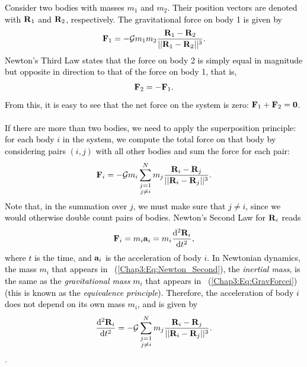 \documentclass[main.tex]{subfiles}
\begin{document}
\begin{tcolorbox}[sharp corners, colback=blue!30, colframe=blue!80!blue, title=Box \refstepcounter{educhap3}\label{boxchap3:dynII}\ref{boxchap3:dynII} -- Orbital Dynamics II]
\par \textcolor{black}{Consider two bodies with masses $m_1$ and $m_2$. Their position vectors are denoted with ${\mathbf{R}}_1$ and ${\mathbf{R}}_2$, respectively. The gravitational force on body 1 is given by
\begin{align}
\label{Chap3:Eq:F_1_vec}
{\mathbf{F}}_{1} = - \mathcal{G} m_1m_2 \frac{{\mathbf{R}}_1 - {\mathbf{R}}_2}{|| {\mathbf{R}}_1 - {\mathbf{R}}_2||^3}.
\end{align}
Newton's Third Law states that the force on body 2 is simply equal in magnitude but opposite in direction to that of the force on body 1, that is,
\begin{align}
{\mathbf{F}}_{2} = - {\mathbf{F}}_{1}.
\end{align}
From this, it is easy to see that the net force on the system is zero: ${\mathbf{F}}_1 + {\mathbf{F}}_2 = {\mathbf{0}}$. \\ \\
If there are more than two bodies, we need to apply the superposition principle: for each body $i$ in the system, we compute the total force on that body by considering pairs $(i,j)$ with all other bodies and sum the force for each pair:
\begin{align}
\label{Chap3:Eq:GravForcei}
{\mathbf{F}}_i = -\mathcal{G} m_i \sum_{\substack{j=1 \\ j\neq i}}^{N} m_j \frac{ {\mathbf{R}}_i - {\mathbf{R}}_j}{|| {\mathbf{R}}_i - {\mathbf{R}}_j||^3}.
\end{align}
Note that, in the summation over $j$, we must make sure that $j\neq i$, since we would otherwise double count pairs of bodies. Newton's Second Law for ${\mathbf{R}}_i$ reads
\begin{align}
\label{Chap3:Eq:Newton_Second}
{\mathbf{F}}_i = m_i {\mathbf{a}}_i = m_i \frac{\mathrm{d}^2 {\mathbf{R}}_i}{\mathrm{d} t^2},
\end{align}
where $t$ is the time, and ${\mathbf{a}}_i$ is the acceleration of body $i$. In Newtonian dynamics, the mass $m_i$ that appears in \Eq~(\ref{Chap3:Eq:Newton_Second}), the {\it inertial mass}, is the same as the {\it gravitational mass} $m_i$ that appears in \Eq~(\ref{Chap3:Eq:GravForcei}) (this is known as the {\it equivalence principle}). Therefore, the acceleration of body $i$ does not depend on its own mass $m_i$, and is given by
\begin{align}
\label{Chap3:Eq:EOM}
\frac{\mathrm{d}^2 {\mathbf{R}}_i}{\mathrm{d} t^2} = - \mathcal{G} \sum_{\substack{j=1 \\ j\neq i}}^{N} m_j \frac{ {\mathbf{R}}_i - {\mathbf{R}}_j}{|| {\mathbf{R}}_i - {\mathbf{R}}_j||^3}.
\end{align}
}.  
\end{tcolorbox}
\end{document}
